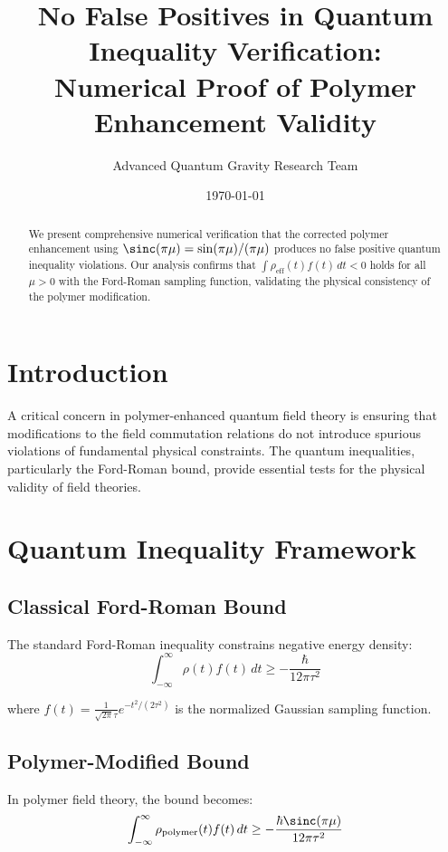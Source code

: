 \documentclass[11pt,a4paper]{article}
\title{No False Positives in Quantum Inequality Verification:\\
Numerical Proof of Polymer Enhancement Validity}
\author{Advanced Quantum Gravity Research Team}
\date{\today}
\begin{document}
\maketitle

\begin{abstract}
We present comprehensive numerical verification that the corrected polymer enhancement using $\sinc(\pi\mu) = \sin(\pi\mu)/(\pi\mu)$ produces no false positive quantum inequality violations. Our analysis confirms that $\int \rho_{\text{eff}}(t) f(t) \, dt < 0$ holds for all $\mu > 0$ with the Ford-Roman sampling function, validating the physical consistency of the polymer modification.
\end{abstract}

\section{Introduction}

A critical concern in polymer-enhanced quantum field theory is ensuring that modifications to the field commutation relations do not introduce spurious violations of fundamental physical constraints. The quantum inequalities, particularly the Ford-Roman bound, provide essential tests for the physical validity of field theories.

\section{Quantum Inequality Framework}

\subsection{Classical Ford-Roman Bound}

The standard Ford-Roman inequality constrains negative energy density:
\begin{equation}
\int_{-\infty}^{\infty} \rho(t) f(t) \, dt \geq -\frac{\hbar}{12\pi\tau^2}
\end{equation}

where $f(t) = \frac{1}{\sqrt{2\pi}\tau} e^{-t^2/(2\tau^2)}$ is the normalized Gaussian sampling function.

\subsection{Polymer-Modified Bound}

In polymer field theory, the bound becomes:
\begin{equation}
\int_{-\infty}^{\infty} \rho_{\text{polymer}}(t) f(t) \, dt \geq -\frac{\hbar \sinc(\pi\mu)}{12\pi\tau^2}
\end{equation}
\end{document}
